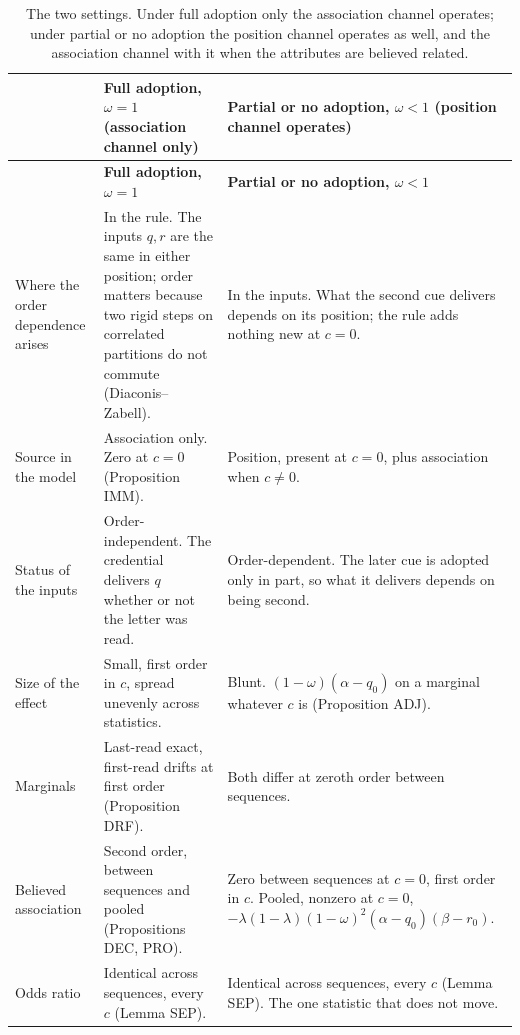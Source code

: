 \documentclass[11pt,a4paper]{article}
\begin{document}
\small
\begin{longtable}{@{}L{3.0cm}L{6.5cm}L{6.5cm}@{}}
\caption{The two settings. Under full adoption only the association channel
operates; under partial or no adoption the position channel operates as
well, and the association channel with it when the attributes are believed
related.}\label{tab:settings}\\
\toprule
& \textbf{Full adoption, $\omega=1$} \newline (association channel only)
& \textbf{Partial or no adoption, $\omega<1$} \newline (position channel operates) \\
\midrule
\endfirsthead
\toprule
& \textbf{Full adoption, $\omega=1$} & \textbf{Partial or no adoption, $\omega<1$} \\
\midrule
\endhead
Where the order dependence arises &
In the rule. The inputs $q,r$ are the same in either position; order matters
because two rigid steps on correlated partitions do not commute
(Diaconis--Zabell). &
In the inputs. What the second cue delivers depends on its position; the
rule adds nothing new at $c=0$. \\
\addlinespace[3pt]
Source in the model &
Association only. Zero at $c=0$ (Proposition IMM). &
Position, present at $c=0$, plus association when $c\neq0$. \\
\addlinespace[3pt]
Status of the inputs &
Order-independent. The credential delivers $q$ whether or not the letter
was read. &
Order-dependent. The later cue is adopted only in part, so what it delivers
depends on being second. \\
\addlinespace[3pt]
Size of the effect &
Small, first order in $c$, spread unevenly across statistics. &
Blunt. $(1-\omega)(\alpha-q_0)$ on a marginal whatever $c$ is
(Proposition ADJ). \\
\addlinespace[3pt]
Marginals &
Last-read exact, first-read drifts at first order (Proposition DRF). &
Both differ at zeroth order between sequences. \\
\addlinespace[3pt]
Believed association &
Second order, between sequences and pooled (Propositions DEC, PRO). &
Zero between sequences at $c=0$, first order in $c$. Pooled, nonzero at
$c=0$, $-\lambda(1-\lambda)(1-\omega)^2(\alpha-q_0)(\beta-r_0)$. \\
\addlinespace[3pt]
Odds ratio &
Identical across sequences, every $c$ (Lemma SEP). &
Identical across sequences, every $c$ (Lemma SEP). The one statistic that
does not move. \\

\end{longtable}
\end{document}
